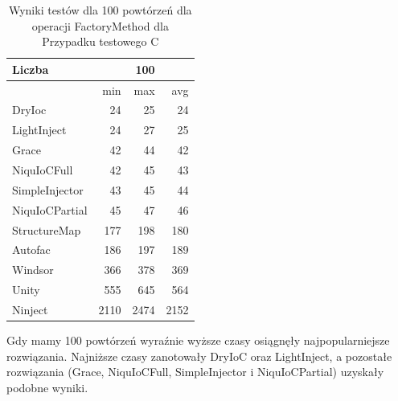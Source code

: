 \documentclass[12pt]{article}
\begin{document}
\begin{table}[H]
\captionsetup{belowskip=0pt,aboveskip=0pt}
\begin{center}
\begin{small}
	\begin{tabular}{ | l | r r r | }
    		\hline
Liczba & & 100 & \\ \hline
 & min & max & avg \\ \hline
DryIoc & 24 & 25 & 24 \\ \hline
LightInject & 24 & 27 & 25 \\ \hline
Grace & 42 & 44 & 42 \\ \hline
NiquIoCFull & 42 & 45 & 43 \\ \hline
SimpleInjector & 43 & 45 & 44 \\ \hline
NiquIoCPartial & 45 & 47 & 46 \\ \hline
StructureMap & 177 & 198 & 180 \\ \hline
Autofac & 186 & 197 & 189 \\ \hline
Windsor & 366 & 378 & 369 \\ \hline
Unity & 555 & 645 & 564 \\ \hline
Ninject & 2110 & 2474 & 2152 \\ \hline
  	\end{tabular}
\end{small}
\end{center}
\caption{Wyniki testów dla 100 powtórzeń dla operacji FactoryMethod dla Przypadku testowego C}
\label{TestCaseC_FactoryMethod100}
\end{table}
Gdy mamy 100 powtórzeń wyraźnie wyższe czasy osiągnęły najpopularniejsze rozwiązania. Najniższe czasy zanotowały DryIoC oraz LightInject, a pozostałe rozwiązania (Grace, NiquIoCFull, SimpleInjector i NiquIoCPartial) uzyskały podobne wyniki.
\\ \\
\end{document}
